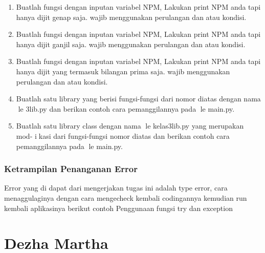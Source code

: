 \begin{enumerate}
    \item Buatlah fungsi dengan inputan variabel NPM, Lakukan print NPM anda tapi
    hanya dijit genap saja. wajib menggunakan perulangan dan atau kondisi.
    

    \item Buatlah fungsi dengan inputan variabel NPM, Lakukan print NPM anda tapi
    hanya dijit ganjil saja. wajib menggunakan perulangan dan atau kondisi.
    

    \item Buatlah fungsi dengan inputan variabel NPM, Lakukan print NPM anda tapi
    hanya dijit yang termasuk bilangan prima saja. wajib menggunakan perulangan
    dan atau kondisi.
    

    \item Buatlah satu library yang berisi fungsi-fungsi dari nomor diatas dengan nama
    le 3lib.py dan berikan contoh cara pemanggilannya pada le main.py.
    

    \item Buatlah satu library class dengan nama le kelas3lib.py yang merupakan mod-
    ikasi dari fungsi-fungsi nomor diatas dan berikan contoh cara pemanggilannya
    pada le main.py.
    

\end{enumerate}
\subsubsection{Ketrampilan Penanganan Error}
Error yang di dapat dari mengerjakan tugas ini adalah type error, cara menaggulaginya dengan cara mengecheck kembali codingannya
kemudian run kembali aplikasinya
berikut contoh Penggunaan fungsi try dan exception

\section{Dezha Martha}
